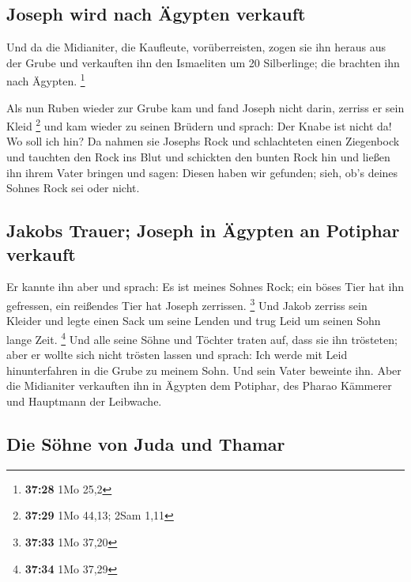 \hypertarget{joseph-wird-nach-uxe4gypten-verkauft}{%
\subsection{Joseph wird nach Ägypten
verkauft}\label{joseph-wird-nach-uxe4gypten-verkauft}}

 Und da die Midianiter, die Kaufleute, vorüberreisten,
zogen sie ihn heraus aus der Grube und verkauften ihn den Ismaeliten um
20 Silberlinge; die brachten ihn nach Ägypten. \footnote{\textbf{37:28}
  1Mo 25,2}

 Als nun Ruben wieder zur Grube kam und fand Joseph nicht
darin, zerriss er sein Kleid \footnote{\textbf{37:29} 1Mo 44,13; 2Sam
  1,11}  und kam wieder zu seinen Brüdern und sprach: Der
Knabe ist nicht da! Wo soll ich hin?  Da nahmen sie
Josephs Rock und schlachteten einen Ziegenbock und tauchten den Rock ins
Blut  und schickten den bunten Rock hin und ließen ihn
ihrem Vater bringen und sagen: Diesen haben wir gefunden; sieh, ob's
deines Sohnes Rock sei oder nicht.

\hypertarget{jakobs-trauer-joseph-in-uxe4gypten-an-potiphar-verkauft}{%
\subsection{Jakobs Trauer; Joseph in Ägypten an Potiphar
verkauft}\label{jakobs-trauer-joseph-in-uxe4gypten-an-potiphar-verkauft}}

 Er kannte ihn aber und sprach: Es ist meines Sohnes
Rock; ein böses Tier hat ihn gefressen, ein reißendes Tier hat Joseph
zerrissen. \footnote{\textbf{37:33} 1Mo 37,20}  Und Jakob
zerriss sein Kleider und legte einen Sack um seine Lenden und trug Leid
um seinen Sohn lange Zeit. \footnote{\textbf{37:34} 1Mo 37,29}
 Und alle seine Söhne und Töchter traten auf, dass sie
ihn trösteten; aber er wollte sich nicht trösten lassen und sprach: Ich
werde mit Leid hinunterfahren in die Grube zu meinem Sohn. Und sein
Vater beweinte ihn.  Aber die Midianiter verkauften ihn
in Ägypten dem Potiphar, des Pharao Kämmerer und Hauptmann der
Leibwache.

\hypertarget{die-suxf6hne-von-juda-und-thamar}{%
\subsection{Die Söhne von Juda und
Thamar}\label{die-suxf6hne-von-juda-und-thamar}}

